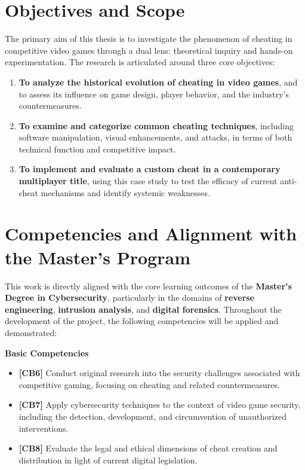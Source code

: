 \section*{Objectives and Scope}

The primary aim of this thesis is to investigate the phenomenon of cheating in competitive video games through a dual lens: theoretical inquiry and hands-on experimentation. The research is articulated around three core objectives:

\begin{enumerate}
    \item \textbf{To analyze the historical evolution of cheating in video games}, and to assess its influence on game design, player behavior, and the industry's countermeasures.

    \item \textbf{To examine and categorize common cheating techniques}, including software manipulation, visual enhancements, and attacks, in terms of both technical function and competitive impact.

    \item \textbf{To implement and evaluate a custom cheat in a contemporary multiplayer title}, using this case study to test the efficacy of current anti-cheat mechanisms and identify systemic weaknesses.
\end{enumerate}

\section*{Competencies and Alignment with the Master's Program}

This work is directly aligned with the core learning outcomes of the \textbf{Master’s Degree in Cybersecurity}, particularly in the domains of \textbf{reverse engineering}, \textbf{intrusion analysis}, and \textbf{digital forensics}. Throughout the development of the project, the following competencies will be applied and demonstrated:

\noindent\textbf{Basic Competencies}
\begin{itemize}
    \item \textbf{[CB6]} Conduct original research into the security challenges associated with competitive gaming, focusing on cheating and related countermeasures.
    \item \textbf{[CB7]} Apply cybersecurity techniques to the context of video game security, including the detection, development, and circumvention of unauthorized interventions.
    \item \textbf{[CB8]} Evaluate the legal and ethical dimensions of cheat creation and distribution in light of current digital legislation.
\end{itemize}


